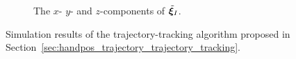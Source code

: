 \begin{figure}[tb]
\begin{minipage}{0.48\textwidth}

        \begin{subfigure}{\textwidth}
            \hspace*{-5mm}
            
            \vspace*{-8mm}
            \caption{The $x$- $y$- and $z$-components of $\tilde{\bm{\xi}}_I$.}
            \label{fig:trajectory_integral}
        \end{subfigure}
        \vspace*{-8mm}
    \end{minipage}
    \caption{Simulation results of the trajectory-tracking algorithm proposed in Section~\ref{sec:handpos_trajectory_trajectory_tracking}.
    }
    \label{fig:trajectory_tracking}
\end{figure}
